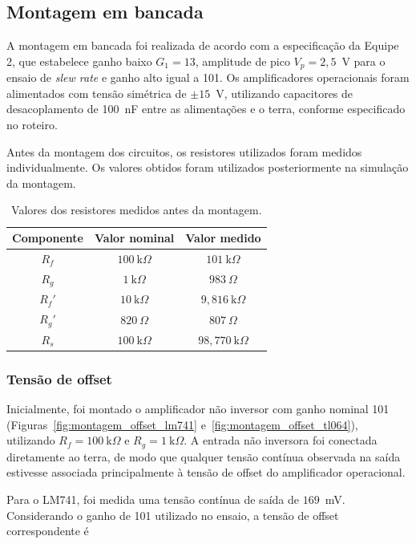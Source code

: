 \documentclass[11pt,a4paper]{article}
\begin{document}
\subsection{Montagem em bancada}

A montagem em bancada foi realizada de acordo com a especificação da Equipe 2, que estabelece ganho baixo $G_1=13$, amplitude de pico $V_p=2{,}5$~V para o ensaio de \textit{slew rate} e ganho alto igual a 101. Os amplificadores operacionais foram alimentados com tensão simétrica de $\pm15$~V, utilizando capacitores de desacoplamento de 100~nF entre as alimentações e o terra, conforme especificado no roteiro.

Antes da montagem dos circuitos, os resistores utilizados foram medidos individualmente. Os valores obtidos foram utilizados posteriormente na simulação da montagem.

\begin{table}[H]
\centering
\caption{Valores dos resistores medidos antes da montagem.}
\label{tab:resistores_bancada}
\begin{tabular}{c c c}
\hline
\textbf{Componente} & \textbf{Valor nominal} & \textbf{Valor medido} \\
\hline
$R_f$ & $100~\mathrm{k}\Omega$ & $101~\mathrm{k}\Omega$ \\
$R_g$ & $1~\mathrm{k}\Omega$ & $983~\Omega$ \\
$R_f'$ & $10~\mathrm{k}\Omega$ & $9{,}816~\mathrm{k}\Omega$ \\
$R_g'$ & $820~\Omega$ & $807~\Omega$ \\
$R_s$ & $100~\mathrm{k}\Omega$ & $98{,}770~\mathrm{k}\Omega$ \\
\hline
\end{tabular}
\end{table}

\subsubsection{Tensão de offset}

Inicialmente, foi montado o amplificador não inversor com ganho nominal 101 (Figuras~\ref{fig:montagem_offset_lm741} e~\ref{fig:montagem_offset_tl064}), utilizando $R_f=100~\mathrm{k}\Omega$ e $R_g=1~\mathrm{k}\Omega$. A entrada não inversora foi conectada diretamente ao terra, de modo que qualquer tensão contínua observada na saída estivesse associada principalmente à tensão de offset do amplificador operacional.

Para o LM741, foi medida uma tensão contínua de saída de $169$~mV. Considerando o ganho de 101 utilizado no ensaio, a tensão de offset correspondente é
\end{document}
